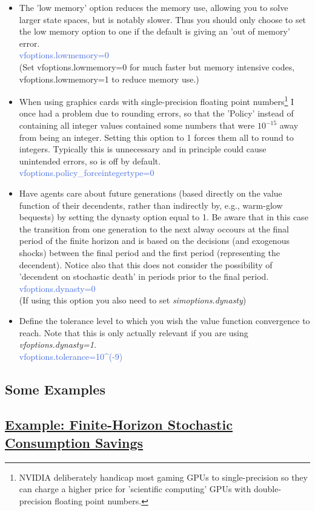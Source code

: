 \begin{itemize}
  \item The 'low memory' option reduces the memory use, allowing you to solve larger state spaces, but is notably slower. Thus you should only
      choose to set the low memory option to one if the default is giving an 'out of memory' error. \\
      \textcolor{RoyalBlue}{vfoptions.lowmemory=0} \\
       (Set vfoptions.lowmemory=0 for much faster but memory intensive codes, vfoptions.lowmemory=1 to reduce memory use.) \\
  \item When using graphics cards with single-precision floating point numbers\footnote{NVIDIA deliberately handicap most gaming GPUs to single-precision so they can charge a higher price for 'scientific computing'
    GPUs with double-precision floating point numbers.} I once had a problem due to rounding errors, so that the 'Policy' instead of containing all integer values contained some numbers
    that were $10^{-15}$ away from being an integer. Setting this option to 1 forces them all to round to integers. Typically this is unnecessary and in principle could cause unintended errors, so is off by default. \\
    \textcolor{RoyalBlue}{vfoptions.policy\_{}forceintegertype=0}
  \item Have agents care about future generations (based directly on the value function of their decendents, rather than indirectly by, e.g., warm-glow bequests) by setting the dynasty option equal to 1. Be aware that in this case the transition from one generation to the next alway occours at the final period of the finite horizon and is based on the decisions (and exogenous shocks) between the final period and the first period (representing the decendent). Notice also that this does not consider the possibility of 'decendent on stochastic death' in periods prior to the final period. \\
  \textcolor{RoyalBlue}{vfoptions.dynasty=0} \\
  (If using this option you also need to set \textit{simoptions.dynasty})
  \item Define the tolerance level to which you wish the value function convergence to reach. Note that this is only actually relevant if you are using \textit{vfoptions.dynasty=1}. \\
    \textcolor{RoyalBlue}{vfoptions.tolerance=10\^{}(-9)}

\end{itemize}

\subsection{Some Examples}
\subsection*{\hyperref[example:FHorzStochConsSavings]{Example: Finite-Horizon Stochastic Consumption Savings}}
